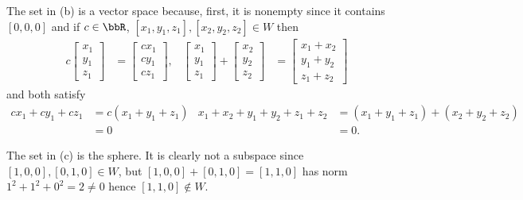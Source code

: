 \begin{questions}
\begin{solution}
    The set in (b) is a vector space because, first, it is nonempty since
    it contains $[0,0,0]$ and if $c\in\bbR$,
    $[x_1,y_1,z_1],[x_2,y_2,z_2]\in W$ then
    \begin{align*}
      c\begin{bmatrix}
        x_1\\
        y_1\\
        z_1
      \end{bmatrix}
      &=\begin{bmatrix}
        cx_1\\
        cy_1\\
        cz_1
      \end{bmatrix},&
      \begin{bmatrix}
        x_1\\
        y_1\\
        z_1
      \end{bmatrix}+
      \begin{bmatrix}
        x_2\\
        y_2\\
        z_2
      \end{bmatrix}
     &=\begin{bmatrix}
        x_1+x_2\\
        y_1+y_2\\
        z_1+z_2
      \end{bmatrix}
    \end{align*}
    and both satisfy
    \begin{align*}
      cx_1+cy_1+cz_1
      &=c(x_1+y_1+z_1)&
      x_1+x_2+y_1+y_2+z_1+z_2
      &=(x_1+y_1+z_1)+(x_2+y_2+z_2)\\
      &=0&&=0.
    \end{align*}

    The set in (c) is the sphere. It is clearly not a subspace since
    $[1,0,0],[0,1,0]\in W$, but $[1,0,0]+[0,1,0]=[1,1,0]$ has norm
    $1^2+1^2+0^2=2\neq 0$ hence $[1,1,0]\notin W$.


\end{solution}
\end{questions}
